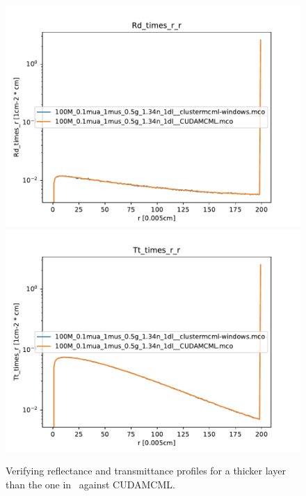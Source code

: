 \documentclass[]{article}
\begin{document}
\begin{figure}[ht!]
\includegraphics[width=\linewidth]{img/verification3.pdf}
\includegraphics[width=\linewidth]{img/verification4.pdf}
\caption{Verifying reflectance and transmittance profiles for a thicker layer than the one in~ against CUDAMCML.}
\label{verification3}
\end{figure}
\end{document}
